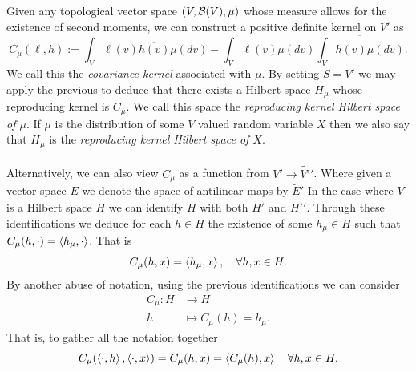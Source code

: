 \documentclass[
    a4paper,
    DIV=14,
    abstract=true,
    numbers=noenddot
]{scrartcl}
\begin{document}
Given any topological vector space $(V,\mathcal{B}(V),\mu )$ whose measure allows for the existence of second moments, we can construct a positive definite kernel on $V'$ as
\begin{equation*}
	C_\mu (\ell ,h):=\int_{V}\ell (v) \overline{h(v)}\mu (dv)-\int_{V}\ell (v) \mu (dv)\overline{\int_{V}h(v)\mu (dv)}.
\end{equation*}
We call this the \emph{covariance kernel} associated with $\mu $. By setting $S=V'$ we may apply the previous 
to deduce that there exists a Hilbert space $H_\mu $ whose reproducing kernel is $C_\mu $. We call this space the \emph{reproducing kernel Hilbert space of $\mu $}. If $\mu $ is the distribution of some $V$ valued random variable $X$ then we also say that $H_\mu $ is the  \emph{reproducing kernel Hilbert space of $X$}.\\
\\
Alternatively, we can also view  $C_\mu $ as a function from $V'\to \tilde{V'}'$. Where given a vector space $E$ we denote the space of antilinear maps by   $\tilde{E}'$ In the case where $V$ is a Hilbert space $H$ we can identify $H$ with both $H'$ and $\tilde{H'}'$. Through these identifications we deduce for each $h\in H$ the existence of  some $h_\mu \in H$ such that
$C_\mu (h,\cdot )=\left\langle h_\mu,\cdot  \right\rangle$. That is
\begin{equation*}
	C_\mu (h,x)=\left\langle h_\mu,x\right\rangle,\quad\forall h,x \in H .
\end{equation*}
By another abuse of notation, using the previous identifications we can consider
\begin{align*}
	C_\mu : H & \longrightarrow H             \\
	h         & \longmapsto C_\mu (h) = h_\mu
	.\end{align*}
That is, to gather all the notation together
\begin{equation*}
	C_\mu (\left\langle\cdot ,h\right\rangle,\left\langle\cdot ,x\right\rangle)=C_\mu (h,x)=\left\langle C_\mu (h),x\right\rangle\quad\forall h,x\in H.
\end{equation*}
\end{document}
